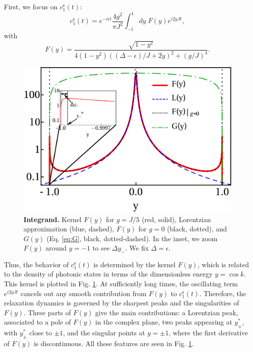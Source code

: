 \documentclass[aps,pra,twocolumn,floatfix,superscriptaddress]{revtex4-1}%
\begin{document}
First, we focus on  $c_1^\text{s}(t)$:
\begin{equation}
c_1^\text{s}(t) =  e^{-i\epsilon t}\frac{4g^2}{\pi J^2}\int_{-1}^1 dy\; F(y)e^{i2yJt}, \label{eq:c_sc_app}
\end{equation}
with
\begin{equation}
F(y)=\frac{\sqrt{1-y^2}}{4(1-y^2)\left((\Delta-\epsilon)/J+2y\right)^2+(g/J)^4}.\label{eq:F}
\end{equation}
\begin{figure}[thb!]
\includegraphics[width=1.0\columnwidth]{integrand_inset_Delta_0_g_0_2.pdf}
\caption{{\bf Integrand.} Kernel $F(y)$ for $g=J/5$ (red, solid), Lorentzian approximation (blue, dashed), $F(y)$ for $g=0$ (black, dotted), and $G(y)$ (Eq. \eqref{eq:G}, black, dotted-dashed). In the inset, we zoom $F(y)$ around $y=-1$ to see $\Delta y_-$. We fix $\Delta=\epsilon$.}\label{fig:integrand}
\end{figure}
Thus, the behavior of $c_1^\text{s}(t)$ is determined by the kernel $F(y)$, which is related to the density of photonic states in terms of the dimensionless energy $y = \cos k$. This kernel is plotted in Fig. \ref{fig:integrand}. At sufficiently long times, the oscillating term $e^{i2yJt}$ cancels out any smooth contribution from $F(y)$ to $c_1^\text{s}(t)$. %
Therefore, the relaxation dynamics is governed by the sharpest peaks and the singularities of $F(y)$. Three parts of $F(y)$ give the main contributions: a Lorentzian peak, associated to a pole of $F(y)$ in the complex plane, two peaks appearing at $y_\pm^*$, with $y_\pm^*$ close to $\pm 1$, and the singular points at $y=\pm 1$, where the first derivative of $F(y)$ is discontinuous. All these features are seen in Fig. \ref{fig:integrand}.
\end{document}
